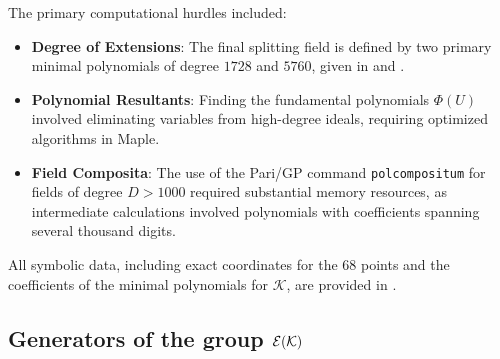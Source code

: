 \documentclass[11pt]{amsart}
\begin{document}
The primary computational hurdles included:
\begin{itemize}
	\item \textbf{Degree of Extensions}: The final splitting field is defined by two primary minimal polynomials of degree $1728$ and $5760$, given in  \cite[Pol-1728]{Shioda360-Codes} and   \cite[Pol-5760]{Shioda360-Codes}.
	\item \textbf{Polynomial Resultants}: Finding the fundamental polynomials $\Phi(U)$ involved eliminating variables from high-degree ideals, requiring optimized algorithms in Maple.
	\item \textbf{Field Composita}: The use of the \textsf{Pari/GP} command \texttt{polcompositum} for fields of degree $D > 1000$ required substantial memory resources, as intermediate calculations involved polynomials with coefficients spanning several thousand digits.
\end{itemize}

All symbolic data, including exact coordinates for the $68$ points and the coefficients of the minimal polynomials for $\mathcal{K}$, are provided in \cite[Points-68]{Shioda360-Codes}.


 
 \iffalse

\subsection{Generators of the group  ${\mathcal E}({\mathcal K})$}
\label{generatos}
 
\end{document}
